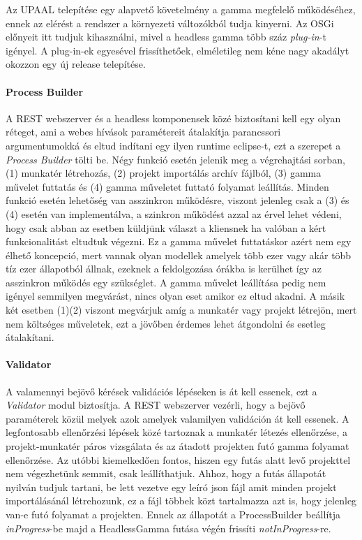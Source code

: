 Az UPAAL telepítése egy alapvető követelmény a gamma megfelelő működéséhez, ennek az elérést a rendszer a környezeti változókból tudja kinyerni.
Az OSGi előnyeit itt tudjuk kihasználni, mivel a headless gamma több száz \textit{plug-in}-t igényel. A plug-in-ek egyesével frissíthetőek, elméletileg nem kéne nagy akadályt okozzon egy új release telepítése.

\paragraph{Process Builder} A REST webszerver és a headless komponensek közé biztosítani kell egy olyan réteget, ami a webes hívások paramétereit átalakítja parancssori argumentumokká és eltud indítani egy ilyen runtime eclipse-t, ezt a szerepet a \textit{Process Builder} tölti be. Négy funkció esetén jelenik meg a végrehajtási sorban, (1) munkatér létrehozás, (2) projekt importálás archív fájlból, (3) gamma művelet futtatás és (4) gamma műveletet futtató folyamat leállítás. Minden funkció esetén lehetőség van asszinkron működésre, viszont jelenleg csak a (3) és (4) esetén van implementálva,  a szinkron működést azzal az érvel lehet védeni, hogy csak abban az esetben küldjünk választ a kliensnek ha valóban a kért funkcionalitást eltudtuk végezni. Ez a gamma művelet futtatáskor azért nem egy élhető koncepció, mert vannak olyan modellek amelyek több ezer vagy akár több tíz ezer állapotból állnak, ezeknek a feldolgozása órákba is kerülhet így az asszinkron működés egy szükséglet. A gamma művelet leállítása pedig nem igényel semmilyen megvárást, nincs olyan eset amikor ez eltud akadni. A másik két esetben (1)(2) viszont megvárjuk amíg a munkatér vagy projekt létrejön, mert nem költséges műveletek, ezt a jövőben érdemes lehet átgondolni és esetleg átalakítani.
\paragraph{Validator} A valamennyi bejövő kérések validációs lépéseken is át kell essenek, ezt a \textit{Validator} modul biztosítja. A REST webszerver vezérli, hogy a bejövő paraméterek közül melyek azok amelyek valamilyen validáción át kell essenek. A legfontosabb ellenőrzési lépések közé tartoznak a munkatér létezés ellenőrzése, a projekt-munkatér páros vizsgálata és az átadott projekten futó gamma folyamat ellenőrzése. Az utóbbi kiemelkedően fontos, hiszen egy futás alatt levő projekttel nem végezhetünk semmit, csak leállíthatjuk. Ahhoz, hogy a futás állapotát nyilván tudjuk tartani, be lett vezetve egy leíró json fájl amit minden projekt importálásánál létrehozunk, ez a fájl többek közt tartalmazza azt is, hogy jelenleg van-e futó folyamat a projekten. Ennek az állapotát a ProcessBuilder beállítja \textit{inProgress}-be majd a HeadlessGamma futása végén frissíti \textit{notInProgress}-re.
